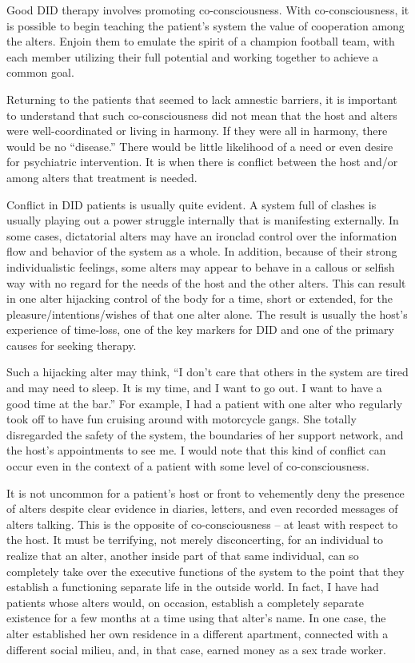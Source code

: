 \documentclass[]{book}
\begin{document}
Good DID therapy involves promoting co-consciousness. With co-consciousness, it is possible to begin teaching the patient's system the value of cooperation among the alters. Enjoin them to emulate the spirit of a champion football team, with each member utilizing their full potential and working together to achieve a common goal.

Returning to the patients that seemed to lack amnestic barriers, it is important to understand that such co-consciousness did not mean that the host and alters were well-coordinated or living in harmony. If they were all in harmony, there would be no ``disease.'' There would be little likelihood of a need or even desire for psychiatric intervention. It is when there is conflict between the host and/or among alters that treatment is needed.

Conflict in DID patients is usually quite evident. A system full of clashes is usually playing out a power struggle internally that is manifesting externally. In some cases, dictatorial alters may have an ironclad control over the information flow and behavior of the system as a whole. In addition, because of their strong individualistic feelings, some alters may appear to behave in a callous or selfish way with no regard for the needs of the host and the other alters. This can result in one alter hijacking control of the body for a time, short or extended, for the pleasure/intentions/wishes of that one alter alone. The result is usually the host's experience of time-loss, one of the key markers for DID and one of the primary causes for seeking therapy.

Such a hijacking alter may think, ``I don't care that others in the system are tired and may need to sleep. It is my time, and I want to go out. I want to have a good time at the bar.'' For example, I had a patient with one alter who regularly took off to have fun cruising around with motorcycle gangs. She totally disregarded the safety of the system, the boundaries of her support network, and the host's appointments to see me. I would note that this kind of conflict can occur even in the context of a patient with some level of co-consciousness.

It is not uncommon for a patient's host or front to vehemently deny the presence of alters despite clear evidence in diaries, letters, and even recorded messages of alters talking. This is the opposite of co-consciousness -- at least with respect to the host. It must be terrifying, not merely disconcerting, for an individual to realize that an alter, another inside part of that same individual, can so completely take over the executive functions of the system to the point that they establish a functioning separate life in the outside world. In fact, I have had patients whose alters would, on occasion, establish a completely separate existence for a few months at a time using that alter's name. In one case, the alter established her own residence in a different apartment, connected with a different social milieu, and, in that case, earned money as a sex trade worker.
\end{document}
